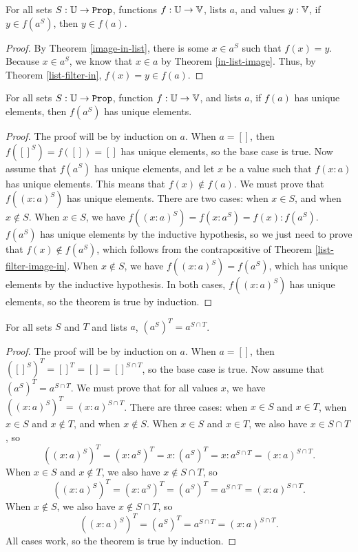 \documentclass[../math.tex]{subfiles}
\begin{document}
\begin{theorem} \label{list-filter-image-in}
    For all sets $S : \set{\U}$, functions $f : \mathbb{U} \to \mathbb{V}$, lists $a$, and
    values $y : \mathbb{V}$, if $y \in f(a^S)$, then $y \in f(a)$.
\end{theorem}
\begin{proof}
    By Theorem \ref{image-in-list}, there is some $x \in a^S$ such that $f(x) =
    y$.  Because $x \in a^S$, we know that $x \in a$ by Theorem
    \ref{in-list-image}.  Thus, by Theorem \ref{list-filter-in}, $f(x) = y \in
    f(a)$.
\end{proof}

\begin{theorem} \label{list-filter-image-unique}
    For all sets $S : \set{\U}$, function $f : \mathbb{U} \to \mathbb{V}$, and lists $a$, if
    $f(a)$ has unique elements, then $f(a^S)$ has unique elements.
\end{theorem}
\begin{proof}
    The proof will be by induction on $a$.  When $a = []$, then $f([]^S) = f([])
    = []$ has unique elements, so the base case is true.  Now assume that
    $f(a^S)$ has unique elements, and let $x$ be a value such that $f(x : a)$
    has unique elements.  This means that $f(x) \notin f(a)$.  We must prove
    that $f((x : a)^S)$ has unique elements.  There are two cases: when $x \in
    S$, and when $x \notin S$.  When $x \in S$, we have $f((x : a)^S) = f(x :
    a^S) = f(x) : f(a^S)$.  $f(a^S)$ has unique elements by the inductive
    hypothesis, so we just need to prove that $f(x) \notin f(a^S)$, which
    follows from the contrapositive of Theorem \ref{list-filter-image-in}.  When
    $x \notin S$, we have $f((x : a)^S) = f(a^S)$, which has unique elements by
    the inductive hypothesis.  In both cases, $f((x : a)^S)$ has unique
    elements, so the theorem is true by induction.
\end{proof}

\begin{theorem} \label{list-filter-inter}
    For all sets $S$ and $T$ and lists $a$, $(a^S)^T = a^{S \cap T}$.
\end{theorem}
\begin{proof}
    The proof will be by induction on $a$.  When $a = []$, then $([]^S)^T = []^T
    = [] = []^{S \cap T}$, so the base case is true.  Now assume that $(a^S)^T =
    a^{S \cap T}$.  We must prove that for all values $x$, we have $((x :
    a)^S)^T = (x : a)^{S \cap T}$.  There are three cases: when $x \in S$ and $x
    \in T$, when $x \in S$ and $x \notin T$, and when $x \notin S$.  When $x \in
    S$ and $x \in T$, we also have $x \in S \cap T$, so
    \[
        ((x : a)^S)^T = (x : a^S)^T = x : (a^S)^T = x : a^{S \cap T}
        = (x : a)^{S \cap T}.
    \]
    When $x \in S$ and $x \notin T$, we also have $x \notin S \cap T$, so
    \[
        ((x : a)^S)^T = (x : a^S)^T = (a^S)^T = a^{S \cap T}
        = (x : a)^{S \cap T}.
    \]
    When $x \notin S$, we also have $x \notin S \cap T$, so
    \[
        ((x : a)^S)^T = (a^S)^T = a^{S \cap T} = (x : a)^{S \cap T}.
    \]
    All cases work, so the theorem is true by induction.
\end{proof}
\end{document}
